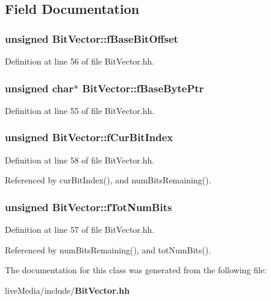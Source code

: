 \subsection{Field Documentation}
\subsubsection[{f\+Base\+Bit\+Offset}]{\setlength{\rightskip}{0pt plus 5cm}unsigned Bit\+Vector\+::f\+Base\+Bit\+Offset\hspace{0.3cm}{\ttfamily [private]}}\label{classBitVector_ac6c8c31d653a9df46fc41931c1c9115d}


Definition at line 56 of file Bit\+Vector.\+hh.

\subsubsection[{f\+Base\+Byte\+Ptr}]{\setlength{\rightskip}{0pt plus 5cm}unsigned char$\ast$ Bit\+Vector\+::f\+Base\+Byte\+Ptr\hspace{0.3cm}{\ttfamily [private]}}\label{classBitVector_a54d91cd0f345ba06000378cca24a02b1}


Definition at line 55 of file Bit\+Vector.\+hh.

\subsubsection[{f\+Cur\+Bit\+Index}]{\setlength{\rightskip}{0pt plus 5cm}unsigned Bit\+Vector\+::f\+Cur\+Bit\+Index\hspace{0.3cm}{\ttfamily [private]}}\label{classBitVector_a048459390d280ea3fb9b34738f09b6c0}


Definition at line 58 of file Bit\+Vector.\+hh.



Referenced by cur\+Bit\+Index(), and num\+Bits\+Remaining().

\subsubsection[{f\+Tot\+Num\+Bits}]{\setlength{\rightskip}{0pt plus 5cm}unsigned Bit\+Vector\+::f\+Tot\+Num\+Bits\hspace{0.3cm}{\ttfamily [private]}}\label{classBitVector_a98dcf8e2bdf709637e481804b063d8cb}


Definition at line 57 of file Bit\+Vector.\+hh.



Referenced by num\+Bits\+Remaining(), and tot\+Num\+Bits().



The documentation for this class was generated from the following file\+:\begin{DoxyCompactItemize}
\item 
live\+Media/include/{\bf Bit\+Vector.\+hh}\end{DoxyCompactItemize}
